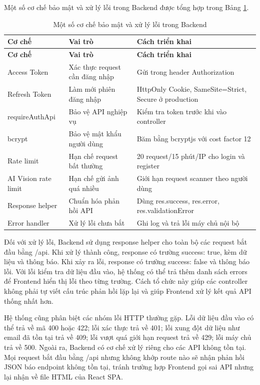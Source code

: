 \documentclass[12pt, a4paper]{report}
\begin{document}
Một số cơ chế bảo mật và xử lý lỗi trong Backend được tổng hợp trong Bảng \ref{tab:bao_mat_xu_ly_loi}.

\begin{longtable}{|>{\raggedright\arraybackslash}p{4cm}|>{\raggedright\arraybackslash}p{4cm}|p{7cm}|}
\caption{Một số cơ chế bảo mật và xử lý lỗi trong Backend}
\label{tab:bao_mat_xu_ly_loi} \\
\hline
\textbf{Cơ chế} & \textbf{Vai trò} & \textbf{Cách triển khai} \\
\hline
\endfirsthead
\hline
\textbf{Cơ chế} & \textbf{Vai trò} & \textbf{Cách triển khai} \\
\hline
\endhead

Access Token & Xác thực request cần đăng nhập & Gửi trong header Authorization \\
\hline
Refresh Token & Làm mới phiên đăng nhập & HttpOnly Cookie, SameSite=Strict, Secure ở production \\
\hline
requireAuthApi & Bảo vệ API nghiệp vụ & Kiểm tra token trước khi vào controller \\
\hline
bcrypt & Bảo vệ mật khẩu người dùng & Băm bằng bcryptjs với cost factor 12 \\
\hline
Rate limit & Hạn chế request bất thường & 20 request/15 phút/IP cho login và register \\
\hline
AI Vision rate limit & Hạn chế gửi ảnh quá nhiều & Giới hạn request scanner theo người dùng \\
\hline
Response helper & Chuẩn hóa phản hồi API & Dùng res.success, res.error, res.validationError \\
\hline
Error handler & Xử lý lỗi chưa bắt & Ghi log và trả lỗi máy chủ nội bộ \\
\hline
\end{longtable}


Đối với xử lý lỗi, Backend sử dụng response helper cho toàn bộ các request bắt đầu bằng /api. Khi xử lý thành công, response có trường success: true, kèm dữ liệu và thông báo. Khi xảy ra lỗi, response có trường success: false và thông báo lỗi. Với lỗi kiểm tra dữ liệu đầu vào, hệ thống có thể trả thêm danh sách errors để Frontend hiển thị lỗi theo từng trường. Cách tổ chức này giúp các controller không phải tự viết cấu trúc phản hồi lặp lại và giúp Frontend xử lý kết quả API thống nhất hơn.

Hệ thống cũng phân biệt các nhóm lỗi HTTP thường gặp. Lỗi dữ liệu đầu vào có thể trả về mã 400 hoặc 422; lỗi xác thực trả về 401; lỗi xung đột dữ liệu như email đã tồn tại trả về 409; lỗi vượt quá giới hạn request trả về 429; lỗi máy chủ trả về 500. Ngoài ra, Backend có cơ chế xử lý riêng cho các API không tồn tại. Mọi request bắt đầu bằng /api nhưng không khớp route nào sẽ nhận phản hồi JSON báo endpoint không tồn tại, tránh trường hợp Frontend gọi sai API nhưng lại nhận về file HTML của React SPA.
\end{document}
